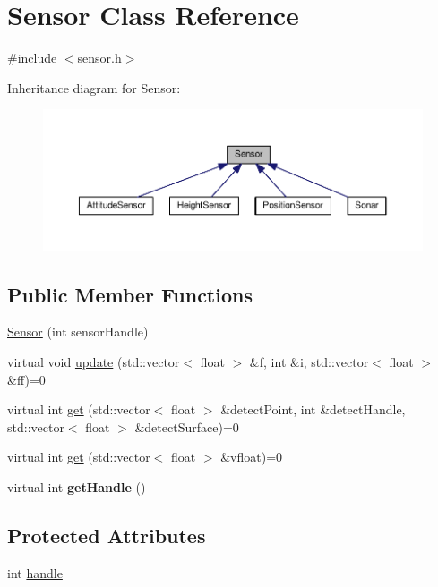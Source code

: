 \hypertarget{classSensor}{}\section{Sensor Class Reference}
\label{classSensor}


{\ttfamily \#include $<$sensor.\+h$>$}



Inheritance diagram for Sensor\+:\nopagebreak
\begin{figure}[H]
\begin{center}
\leavevmode
\includegraphics[width=350pt]{classSensor__inherit__graph}
\end{center}
\end{figure}
\subsection*{Public Member Functions}
\begin{DoxyCompactItemize}
\item 
\hyperlink{classSensor_aec15220e0b38da37e43b0525ac689499}{Sensor} (int sensor\+Handle)
\item 
virtual void \hyperlink{classSensor_abb6c93c88529bc392d129443b3d352f3}{update} (std\+::vector$<$ float $>$ \&f, int \&i, std\+::vector$<$ float $>$ \&ff)=0
\item 
virtual int \hyperlink{classSensor_a997a8679d48c4fa346e6ac43c1e6219a}{get} (std\+::vector$<$ float $>$ \&detect\+Point, int \&detect\+Handle, std\+::vector$<$ float $>$ \&detect\+Surface)=0
\item 
virtual int \hyperlink{classSensor_a24f11619b11d5effc4066546629179ae}{get} (std\+::vector$<$ float $>$ \&vfloat)=0
\item 
virtual int {\bfseries get\+Handle} ()\hypertarget{classSensor_ac647e98897da5ffcc9711ba27ec45abd}{}\label{classSensor_ac647e98897da5ffcc9711ba27ec45abd}

\end{DoxyCompactItemize}
\subsection*{Protected Attributes}
\begin{DoxyCompactItemize}
\item 
int \hyperlink{classSensor_ad31f2503e8a1cc7888e5eefbeede8f3b}{handle}
\end{DoxyCompactItemize}



